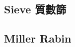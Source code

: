\documentclass[a4paper,10pt,twocolumn,oneside]{article}
\begin{document}
\subsection{Sieve 質數篩}


% 

% 

% 

% 

% 

% 

% 

\subsection{Miller Rabin}


% 
\end{document}
